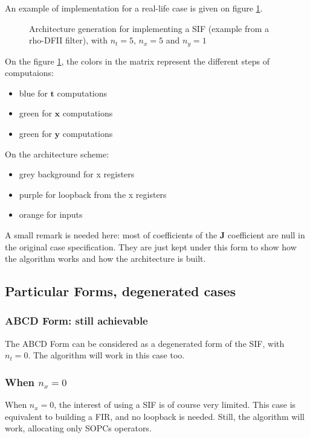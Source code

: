 	An example of implementation for a real-life case is given on figure \ref{fig:SIFimpl}.

	\begin{figure}[!h]
	\begin{center}
	\scalebox{7}{}
	\end{center}
	\caption{ Architecture generation for implementing a SIF (example from a rho-DFII filter), with $n_t=5$, $n_x=5$ and $n_y=1$ \label{fig:SIFimpl}}
	\end{figure}

	On the figure \ref{fig:SIFimpl}, the colors in the matrix represent the different steps of computaions:
	\begin{itemize}
		\item blue for $\boldsymbol{t}$ computations
		\item green for $\boldsymbol{x}$ computations
		\item green for $\boldsymbol{y}$ computations
	\end{itemize}

	On the architecture scheme:
	\begin{itemize}
		\item grey background for x registers
		\item purple for loopback from the x registers
		\item orange for inputs
	\end{itemize}
	
	A small remark is needed here:
	most of coefficients of the $\boldsymbol{J}$ coefficient are null in the original case specification.
	They are just kept under this form to show how the algorithm works and how the architecture is built.
	

\subsection{Particular Forms, degenerated cases}
	\subsubsection{ABCD Form: still achievable}
	The ABCD Form can be considered as a degenerated form of the SIF, with $n_t=0$.
	The algorithm will work in this case too.
	\subsubsection{When $n_x=0$}
	When $n_x=0$, the interest of using a SIF is of course very limited.
	This case is equivalent to building a FIR, and no loopback is needed.
	Still, the algorithm will work, allocating only SOPCs operators.
	
